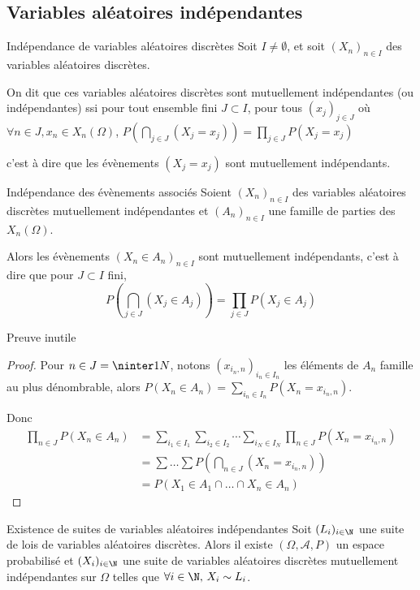 \subsection{Variables aléatoires indépendantes }

\begin{definition}{Indépendance de variables aléatoires discrètes}{}
    Soit $I \neq \emptyset$, et soit $(X_n)_{n \in I}$ des variables aléatoires discrètes. 

    On dit que ces variables aléatoires discrètes sont mutuellement indépendantes
    (ou indépendantes) ssi pour tout ensemble fini $J \subset I$, pour tous 
    $(x_j)_{j \in J}$ où $\forall n \in J, x_n \in X_n(\Omega)$, 
    $\displaystyle P\left( \bigcap_{j \in J} (X_j = x_j) \right) = \prod_{j \in J} P(X_j = x_j)$

    c'est à dire que les évènements $(X_j = x_j)$ sont mutuellement indépendants.
\end{definition}


\begin{proposition}{Indépendance des évènements associés}{}
    Soient $(X_n)_{n \in I}$ des variables aléatoires discrètes mutuellement indépendantes et 
    $(A_n)_{n \in I}$ une famille de parties des $X_n(\Omega)$. 

    Alors les évènements $(X_n \in A_n)_{n \in I}$ sont mutuellement indépendants, c'est à dire que pour 
    $J \subset I$ fini, $$ P\left( \bigcap_{j \in J} (X_j \in A_j) \right) = \prod_{j \in J} P(X_j \in A_j) $$
\end{proposition}

Preuve inutile 
 
\begin{proof}
    Pour $n \in J = \ninter 1 N$, notons 
    $(x_{i_n, n})_{i_n \in I_n}$ les éléments de $A_n$ famille au plus dénombrable, alors 
    $P(X_n \in A_n) = \sum_{i_n \in I_n} P(X_n = x_{i_n, n})$.

    Donc 
    \begin{align}
        \prod_{n \in J} P(X_n \in A_n) & = \sum_{i_1 \in I_1} \sum_{i_2 \in I_2} \cdots \sum_{i_N \in I_N} \prod_{n \in J} P(X_n = x_{i_n, n}) \\
        & = \sum \dots \sum P(\bigcap_{n \in J} (X_n = x_{i_n, n})) \\
        & = P(X_1 \in A_1 \cap \dots \cap X_n \in A_n)
    \end{align}
\end{proof}

\begin{theoreme}{Existence de suites de variables aléatoires indépendantes}{}
    Soit $(L_i)_{i \in \N}$ une suite de lois de variables aléatoires discrètes. Alors il existe 
    $(\Omega, \mathcal A, P)$ un espace probabilisé et $(X_i)_{i \in \N}$ une suite de variables aléatoires discrètes mutuellement indépendantes
    sur $\Omega$ telles que $\forall i \in \N, \, X_i \sim L_i$. 
\end{theoreme}


